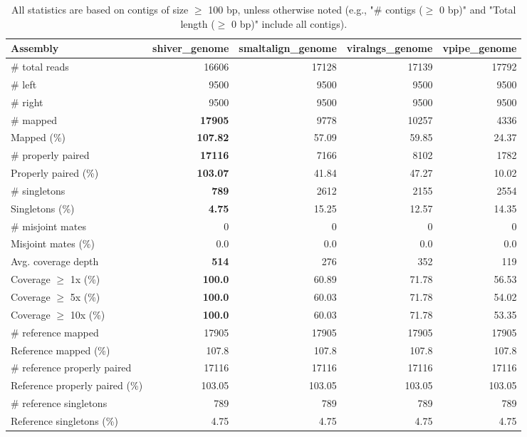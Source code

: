 \documentclass[12pt,a4paper]{article}
\begin{document}
\begin{table}[ht]
\begin{center}
\caption{All statistics are based on contigs of size $\geq$ 100 bp, unless otherwise noted (e.g., "\# contigs ($\geq$ 0 bp)" and "Total length ($\geq$ 0 bp)" include all contigs).}
\begin{tabular}{|l*{4}{|r}|}
\hline
Assembly & shiver\_genome & smaltalign\_genome & viralngs\_genome & vpipe\_genome \\ \hline
\# total reads & 16606 & 17128 & 17139 & 17792 \\ \hline
\# left & 9500 & 9500 & 9500 & 9500 \\ \hline
\# right & 9500 & 9500 & 9500 & 9500 \\ \hline
\# mapped & {\bf 17905} & 9778 & 10257 & 4336 \\ \hline
Mapped (\%) & {\bf 107.82} & 57.09 & 59.85 & 24.37 \\ \hline
\# properly paired & {\bf 17116} & 7166 & 8102 & 1782 \\ \hline
Properly paired (\%) & {\bf 103.07} & 41.84 & 47.27 & 10.02 \\ \hline
\# singletons & {\bf 789} & 2612 & 2155 & 2554 \\ \hline
Singletons (\%) & {\bf 4.75} & 15.25 & 12.57 & 14.35 \\ \hline
\# misjoint mates & 0 & 0 & 0 & 0 \\ \hline
Misjoint mates (\%) & 0.0 & 0.0 & 0.0 & 0.0 \\ \hline
Avg. coverage depth & {\bf 514} & 276 & 352 & 119 \\ \hline
Coverage $\geq$ 1x (\%) & {\bf 100.0} & 60.89 & 71.78 & 56.53 \\ \hline
Coverage $\geq$ 5x (\%) & {\bf 100.0} & 60.03 & 71.78 & 54.02 \\ \hline
Coverage $\geq$ 10x (\%) & {\bf 100.0} & 60.03 & 71.78 & 53.35 \\ \hline
\# reference mapped & 17905 & 17905 & 17905 & 17905 \\ \hline
Reference mapped (\%) & 107.8 & 107.8 & 107.8 & 107.8 \\ \hline
\# reference properly paired & 17116 & 17116 & 17116 & 17116 \\ \hline
Reference properly paired (\%) & 103.05 & 103.05 & 103.05 & 103.05 \\ \hline
\# reference singletons & 789 & 789 & 789 & 789 \\ \hline
Reference singletons (\%) & 4.75 & 4.75 & 4.75 & 4.75 \\ \hline

\end{tabular}
\end{center}
\end{table}
\end{document}
